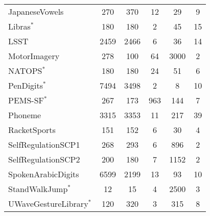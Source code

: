 \documentclass{article}
\begin{document}
\begin{table}[h]
{\begin{tabular}{lccccc}
JapaneseVowels & 270 & 370 & 12 & 29 & 9 \\

Libras$^*$ & 180 & 180 & 2 & 45 & 15 \\

LSST & 2459 & 2466 & 6 & 36 & 14 \\

MotorImagery & 278 & 100 & 64 & 3000 & 2 \\

NATOPS$^*$ & 180 & 180 & 24 & 51 & 6 \\

PenDigits$^*$ & 7494 & 3498 & 2 & 8 & 10 \\

PEMS-SF$^*$ & 267 & 173 & 963 & 144 & 7 \\

Phoneme & 3315 & 3353 & 11 & 217 & 39 \\

RacketSports & 151 & 152 & 6 & 30 & 4 \\

SelfRegulationSCP1 & 268 & 293 & 6 & 896 & 2 \\

SelfRegulationSCP2 & 200 & 180 & 7 & 1152 & 2 \\

SpokenArabicDigits & 6599 & 2199 & 13 & 93 & 10 \\

StandWalkJump$^*$ & 12 & 15 & 4 & 2500 & 3 \\

UWaveGestureLibrary$^*$ & 120 & 320 & 3 & 315 & 8 \\


\bottomrule
    \end{tabular}}
    \label{tab:uea_statistics}
\end{table}


\begin{table}[h]
    \centering
    \caption{Statistics of evaluated anomaly detection datasets.}
    \label{tab:ad_statistics}
\end{table}
\end{document}
